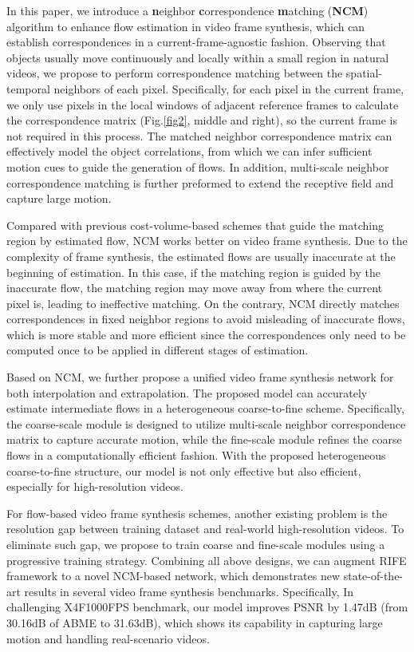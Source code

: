 \documentclass[sigconf]{acmart}
\begin{document}
In this paper, we introduce a \textbf{n}eighbor \textbf{c}orrespondence \textbf{m}atching (\textbf{NCM}) algorithm to enhance flow estimation in video frame synthesis, which can establish correspondences in a current-frame-agnostic fashion. Observing that objects usually move continuously and locally within a small region in natural videos, we propose to perform correspondence matching between the spatial-temporal neighbors of each pixel. Specifically, for each pixel in the current frame, we only use pixels in the local windows of adjacent reference frames to calculate the correspondence matrix  (Fig.\ref{fig2}, middle and right), so the current frame is not required in this process.
The matched neighbor correspondence matrix can effectively model the object correlations, from which we can infer sufficient motion cues to guide the generation of flows. In addition, multi-scale neighbor correspondence matching is further preformed to extend the receptive field and capture large motion. 

Compared with previous cost-volume-based schemes \cite{sun2018pwc,teed2020raft, park2020bmbc} that guide the matching region by estimated flow, NCM works better on video frame synthesis. Due to the complexity of frame synthesis, the estimated flows are usually inaccurate at the beginning of estimation. In this case, if the matching region is guided by the inaccurate flow, the matching region may move away from where the current pixel is, leading to ineffective matching. On the contrary, NCM directly matches correspondences in fixed neighbor regions to avoid misleading of inaccurate flows, which is more stable and more efficient since the correspondences only need to be computed once to be applied in different stages of estimation.



Based on NCM, we further propose a unified video frame synthesis network for both interpolation and extrapolation. The proposed model can accurately estimate intermediate flows in a heterogeneous coarse-to-fine scheme. Specifically, the coarse-scale module is designed to utilize multi-scale neighbor correspondence matrix to capture accurate motion, while the fine-scale module refines the coarse flows in a computationally efficient fashion. With the proposed heterogeneous coarse-to-fine structure, our model is not only effective but also efficient, especially for high-resolution videos.

For flow-based video frame synthesis schemes, another existing problem is the resolution gap between training dataset and real-world high-resolution videos. To eliminate such gap, we propose to train coarse and fine-scale modules using a progressive training strategy. Combining all above designs, we can augment RIFE \cite{jiang2021learning} framework to a novel NCM-based network, which demonstrates new state-of-the-art results in several video frame synthesis benchmarks. Specifically, In challenging X4F1000FPS benchmark, our model improves PSNR by 1.47dB (from 30.16dB of ABME  \cite{park2021asymmetric} to 31.63dB), which shows its capability in capturing large motion and handling real-scenario videos.
\end{document}
